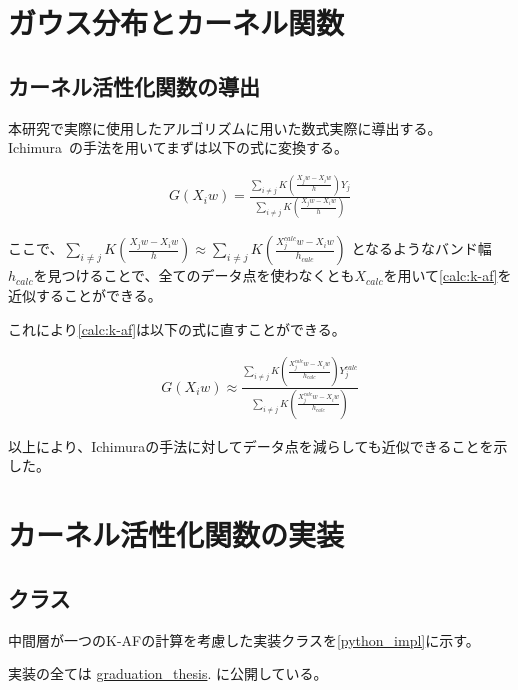 \appendix
\chapter{ガウス分布とカーネル関数}


\section{カーネル活性化関数の導出}
\label{appendix:calc}

本研究で実際に使用したアルゴリズムに用いた数式実際に導出する。
Ichimura~\cite{ichimura}の手法を用いてまずは以下の式に変換する。


\begin{eqnarray}
G(X_iw)=\frac{\sum_{i\neq j} K\left(\frac{X_j w - X_i w}{h}\right)Y_j}{\sum_{i\neq j} K\left(\frac{X_j w - X_i w}{h}\right)}
\label{calc:k-af}
\end{eqnarray}

ここで、$ \sum_{i\neq j} K\left(\frac{X_j w - X_i w}{h}\right) \approx	\sum_{i\neq j} K\left(\frac{X^{calc}_j w - X_i w}{h_{calc}}\right)$
となるようなバンド幅$ h_{calc} $を見つけることで、全てのデータ点を使わなくとも$ X_{calc} $を用いて\ref{calc:k-af}を近似することができる。

これにより\ref{calc:k-af}は以下の式に直すことができる。

\begin{eqnarray}
G(X_iw) \approx \frac{\sum_{i\neq j} K\left(\frac{X^{calc}_j w - X_i w}{h_{calc}}\right)Y^{calc}_j}{\sum_{i\neq j} K\left(\frac{X^{calc}_j w - X_i w}{h_{calc}}\right)}
\label{calc:k-af-2}
\end{eqnarray}

以上により、Ichimuraの手法に対してデータ点を減らしても近似できることを示した。


\chapter{カーネル活性化関数の実装}
\label{appendix:algorithm}


\section{クラス}


中間層が一つのK-AFの計算を考慮した実装クラスを\ref{python_impl}に示す。

実装の全ては \href{https://github.com/latte0/graduation\_thesis}{graduation\_thesis}. に公開している。


